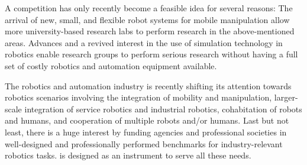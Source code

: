 \clearpage

A \RCAW competition has only recently become a feasible idea for several reasons: The arrival of new, small, and flexible robot systems for mobile manipulation allow more university-based research labs to perform research in the above-mentioned areas. Advances and a revived interest in the use of simulation technology in robotics enable research groups to perform serious research without having a full set of costly robotics and automation equipment available.
\par

The robotics and automation industry is recently shifting its attention towards robotics scenarios involving the integration of mobility and manipulation, larger-scale integration of service robotics and industrial robotics, cohabitation of robots and humans, and cooperation of multiple robots and/or humans. Last but not least, there is a huge interest by funding agencies and professional societies in well-designed and professionally performed benchmarks for industry-relevant robotics tasks. \RCAW is designed as an instrument to serve all these needs.
\par

